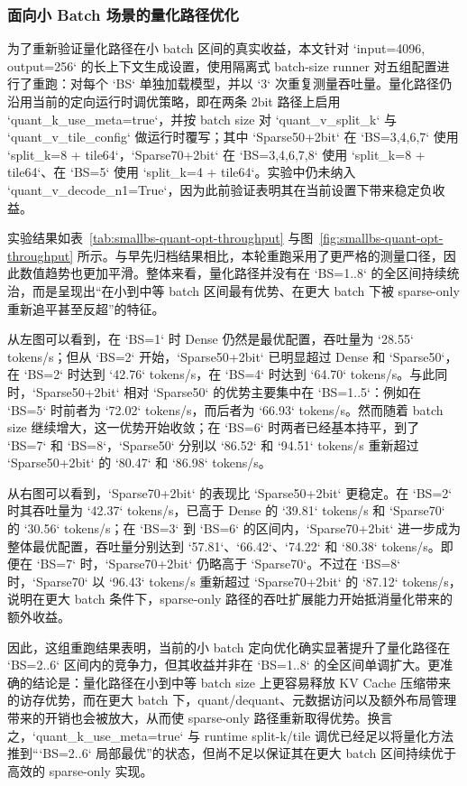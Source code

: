 \subsubsection{面向小 Batch 场景的量化路径优化}

为了重新验证量化路径在小 batch 区间的真实收益，本文针对 `input=4096, output=256` 的长上下文生成设置，使用隔离式 batch-size runner 对五组配置进行了重跑：对每个 `BS` 单独加载模型，并以 `3` 次重复测量吞吐量。量化路径仍沿用当前的定向运行时调优策略，即在两条 2bit 路径上启用 `quant_k_use_meta=true`，并按 batch size 对 `quant_v_split_k` 与 `quant_v_tile_config` 做运行时覆写；其中 `Sparse50+2bit` 在 `BS=3,4,6,7` 使用 `split_k=8 + tile64`，`Sparse70+2bit` 在 `BS=3,4,6,7,8` 使用 `split_k=8 + tile64`、在 `BS=5` 使用 `split_k=4 + tile64`。实验中仍未纳入 `quant_v_decode_n1=True`，因为此前验证表明其在当前设置下带来稳定负收益。

实验结果如表~\ref{tab:smallbs-quant-opt-throughput} 与图~\ref{fig:smallbs-quant-opt-throughput} 所示。与早先归档结果相比，本轮重跑采用了更严格的测量口径，因此数值趋势也更加平滑。整体来看，量化路径并没有在 `BS=1..8` 的全区间持续统治，而是呈现出“在小到中等 batch 区间最有优势、在更大 batch 下被 sparse-only 重新追平甚至反超”的特征。

从左图可以看到，在 `BS=1` 时 Dense 仍然是最优配置，吞吐量为 `28.55` tokens/s；但从 `BS=2` 开始，`Sparse50+2bit` 已明显超过 Dense 和 `Sparse50`，在 `BS=2` 时达到 `42.76` tokens/s，在 `BS=4` 时达到 `64.70` tokens/s。与此同时，`Sparse50+2bit` 相对 `Sparse50` 的优势主要集中在 `BS=1..5`：例如在 `BS=5` 时前者为 `72.02` tokens/s，而后者为 `66.93` tokens/s。然而随着 batch size 继续增大，这一优势开始收敛；在 `BS=6` 时两者已经基本持平，到了 `BS=7` 和 `BS=8`，`Sparse50` 分别以 `86.52` 和 `94.51` tokens/s 重新超过 `Sparse50+2bit` 的 `80.47` 和 `86.98` tokens/s。

从右图可以看到，`Sparse70+2bit` 的表现比 `Sparse50+2bit` 更稳定。在 `BS=2` 时其吞吐量为 `42.37` tokens/s，已高于 Dense 的 `39.81` tokens/s 和 `Sparse70` 的 `30.56` tokens/s；在 `BS=3` 到 `BS=6` 的区间内，`Sparse70+2bit` 进一步成为整体最优配置，吞吐量分别达到 `57.81`、`66.42`、`74.22` 和 `80.38` tokens/s。即便在 `BS=7` 时，`Sparse70+2bit` 仍略高于 `Sparse70`。不过在 `BS=8` 时，`Sparse70` 以 `96.43` tokens/s 重新超过 `Sparse70+2bit` 的 `87.12` tokens/s，说明在更大 batch 条件下，sparse-only 路径的吞吐扩展能力开始抵消量化带来的额外收益。

因此，这组重跑结果表明，当前的小 batch 定向优化确实显著提升了量化路径在 `BS=2..6` 区间内的竞争力，但其收益并非在 `BS=1..8` 的全区间单调扩大。更准确的结论是：量化路径在小到中等 batch size 上更容易释放 KV Cache 压缩带来的访存优势，而在更大 batch 下，quant/dequant、元数据访问以及额外布局管理带来的开销也会被放大，从而使 sparse-only 路径重新取得优势。换言之，`quant_k_use_meta=true` 与 runtime split-k/tile 调优已经足以将量化方法推到“`BS=2..6` 局部最优”的状态，但尚不足以保证其在更大 batch 区间持续优于高效的 sparse-only 实现。

